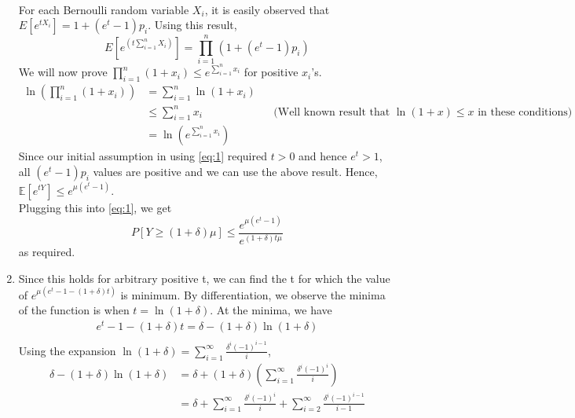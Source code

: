 \begin{enumerate}
\begin{align*}
    \end{align*}
    For each Bernoulli random variable $X_i$, it is easily observed that $E[e^{tX_i}]=1+(e^t-1)p_i$. Using this result,
    \[
        E[e^{\left(t \sum_{i=1}^n X_i\right)}]=\prod_{i=1}^n (1+(e^t-1)p_i)
    \]
    We will now prove $\prod_{i=1}^n (1+x_i) \le e^{\sum_{i=1}^n x_i}$ for positive $x_i$'s.
    \begin{align*}
        \ln\left(\prod_{i=1}^n (1+x_i)\right)&=\sum_{i=1}^n \ln(1+x_i)\\
        &\le \sum_{i=1}^n x_i && \text{(Well known result that $\ln(1+x)\le x$ in these conditions)}\\
        &= \ln\left(e^{\sum_{i=1}^n x_i}\right)
    \end{align*}
    Since our initial assumption in using \ref{eq:1} required $t>0$ and hence $e^t > 1$, all $(e^t-1)p_i$ values are positive and we can use the above result.
    Hence, $\mathbb{E}[e^{tY}] \le e^{\mu (e^t-1)}$.\\
    Plugging this into \ref{eq:1}, we get
    \[
        P[Y\ge (1+\delta)\mu]\le \frac{e^{\mu(e^t-1)}}{e^{(1+\delta)t\mu}}
    \]
    as required.\\
    \item Since this holds for arbitrary positive t, we can find the t for which the value of $e^{\mu (e^t-1-(1+\delta)t)}$ is minimum. By differentiation, we observe the minima of the function is when $t=\ln(1+\delta)$. At the minima, we have
    \begin{align*}
        e^t-1-(1+\delta)t = \delta-(1+\delta)\ln(1+\delta)\\
    \end{align*}
    Using the expansion $\ln(1+\delta)=\sum_{i=1}^{\infty}\frac{\delta^i(-1)^{i-1}}{i}$,
    \begin{align*}
        \delta - (1+\delta)\ln(1+\delta) &= \delta + (1+\delta)(\sum_{i=1}^{\infty}\frac{\delta^i(-1)^i}{i})\\
        &= \delta + \sum_{i=1}^{\infty}\frac{\delta^i(-1)^i}{i} + \sum_{i=2}^{\infty}\frac{\delta^{i}(-1)^{i-1}}{i-1}\\

\end{align*}
\end{enumerate}
